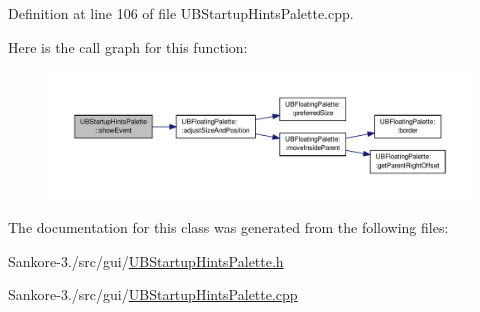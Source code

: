 Definition at line 106 of file U\-B\-Startup\-Hints\-Palette.\-cpp.



Here is the call graph for this function\-:
\nopagebreak
\begin{figure}[H]
\begin{center}
\leavevmode
\includegraphics[width=350pt]{d0/d25/class_u_b_startup_hints_palette_a8b1252835307d05ac38c24059548e822_cgraph}
\end{center}
\end{figure}




The documentation for this class was generated from the following files\-:\begin{DoxyCompactItemize}
\item 
Sankore-\/3./src/gui/\hyperlink{_u_b_startup_hints_palette_8h}{U\-B\-Startup\-Hints\-Palette.\-h}\item 
Sankore-\/3./src/gui/\hyperlink{_u_b_startup_hints_palette_8cpp}{U\-B\-Startup\-Hints\-Palette.\-cpp}\end{DoxyCompactItemize}
